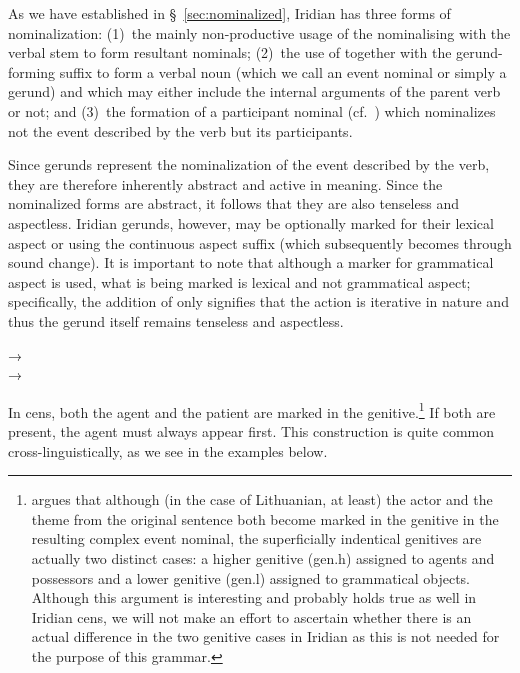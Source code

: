 As we have established in \S~\ref{sec:nominalized}, Iridian has three forms of
nominalization: (1)~the mainly non-productive usage of the
nominalising  with the verbal stem to form resultant nominals; (2)~the
use of  together with the gerund-forming suffix 
to form a verbal noun (which we call an event nominal or simply a gerund) and
which may either include the internal arguments of the parent verb or not; and
(3)~the formation of a participant nominal (cf.~\cite{okuna}) which nominalizes
not the event described by the verb but its participants.

Since gerunds represent the nominalization of the
event described by the verb, they are therefore inherently
abstract and active in meaning. Since the nominalized forms are abstract, it
follows that they are also tenseless and aspectless. Iridian gerunds, however,
may be optionally marked for their lexical aspect or 
 using the continuous aspect suffix 
(which subsequently becomes  through sound change). It is important to
note that although a marker for grammatical aspect is used,
what is being marked is lexical and not grammatical aspect; specifically, the
addition of  only signifies that the action is iterative in nature and
thus the gerund itself remains tenseless and aspectless.

\pex
    \a {} → \\
    \a {} → \\
\xe

In {\sc cen}s, both the agent and the patient are marked in the
genitive.\footnote{\textcite{serekaite2020} argues that although
(in the case of Lithuanian, at least) the actor and the theme from the original
sentence both become marked in the genitive in the resulting complex event
nominal, the superficially indentical genitives are actually two distinct cases:
a higher genitive ({\sc gen.h}) assigned to agents and possessors and a lower
genitive ({\sc gen.l}) assigned to grammatical objects. Although this argument
is interesting and probably holds true as well in Iridian {\sc cen}s, we will
not make an effort to ascertain whether there is an actual difference in the two
genitive cases in Iridian as this is not needed for the purpose of this
grammar.} If both are present, the agent must always appear first. This
construction is quite common cross-linguistically, as we see in the examples
below.

